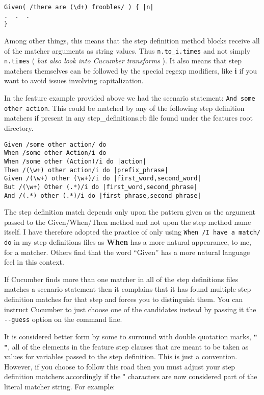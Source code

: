 \begin{verbatim}
Given( /there are (\d+) froobles/ ) { |n|
.  .  .
}
\end{verbatim}
Among other things, this means that the step definition method blocks receive all of the matcher arguments as string values.  Thus \verb+n.to_i.times+ and not simply \verb+n.times+ ( \emph{but also look into Cucumber transforms} ).  It also means that step matchers themselves can be followed by the special regexp modifiers, like \textbf{i} if you want to avoid issues involving capitalization.

In the feature example provided above we had the scenario statement: \verb+And some other action+.  This could be matched by any of the following step definition matchers if present in any step\_definitions.rb file found under the features root directory.
\begin{verbatim}
Given /some other action/ do
When /some other Action/i do 
When /some other (Action)/i do |action|
Then /(\w+) other action/i do |prefix_phrase|
Given /(\w+) other (\w+)/i do |first_word,second_word|
But /(\w+) Other (.*)/i do |first_word,second_phrase|
And /(.*) other (.*)/i do |first_phrase,second_phrase|

\end{verbatim}

The step definition match depends only upon the pattern given as the argument passed to the Given/When/Then method and not upon the step method name itself.  I have therefore adopted the practice of only using \verb+When /I have a match/ do+ in my step definitions files as \textbf{When} has a more natural appearance, to me, for a matcher.  Others find that the word ``Given'' has a more natural language feel in this context.

If Cucumber finds more than one matcher in all of the step definitions files matches a scenario statement then it complains that it has found multiple step definition matches for that step and forces you to distinguish them.  You can instruct Cucumber to just choose one of the candidates instead by passing it the \verb+--guess+ option on the command line.

It is considered better form by some to surround with double quotation marks, \textbf{\verb+" "+}, all of the elements in the feature step clauses that are meant to be taken as values for variables passed to the step definition. This is just a convention.  However, if you choose to follow this road then you must adjust your step definition matchers accordingly if the " characters are now considered part of the literal matcher string.  For example:

